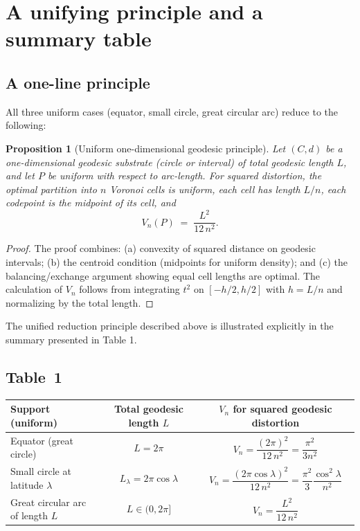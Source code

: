 \documentclass[12pt, reqno]{amsart}
\theoremstyle{plain}
\newtheorem{proposition1}[subsubsection]{Proposition}
\theoremstyle{definition}
\begin{document}
\section{A unifying principle and a summary table}

\subsection{A one-line principle}
All three uniform cases (equator, small circle, great circular arc) reduce to the following:

\begin{proposition1}[Uniform one-dimensional geodesic principle]\label{prop:unifying}
Let $(C,d)$ be a one-dimensional geodesic substrate (circle or interval) of total geodesic length $L$, and let $P$ be uniform with respect to arc-length. For squared distortion, the optimal partition into $n$ Voronoi cells is \emph{uniform}, each cell has length $L/n$, each codepoint is the midpoint of its cell, and
\[
V_n(P) \;=\; \frac{L^2}{12\,n^2}.
\]
\end{proposition1}

\begin{proof}
The proof combines: (a) convexity of squared distance on geodesic intervals; (b) the centroid condition (midpoints for uniform density); and (c) the balancing/exchange argument showing equal cell lengths are optimal. The calculation of $V_n$ follows from integrating $t^2$ on $[-h/2,h/2]$ with $h=L/n$ and normalizing by the total length.
\end{proof}
The unified reduction principle described above is illustrated explicitly in the summary
presented in Table 1.

\subsection{Table~1} 
\medskip
\begin{center}
\begin{tabular}{|l|c|c|}
\hline
\textbf{Support (uniform)} & \textbf{Total geodesic length $L$} & \textbf{$V_n$ for squared geodesic distortion}\\
\hline
Equator (great circle) & $L=2\pi$ & $V_n=\dfrac{(2\pi)^2}{12\,n^2}=\dfrac{\pi^2}{3n^2}$\\
\hline
Small circle at latitude $\lambda$ & $L_\lambda=2\pi\cos\lambda$ & $V_n=\dfrac{(2\pi\cos\lambda)^2}{12\,n^2}=\dfrac{\pi^2}{3}\dfrac{\cos^2\lambda}{n^2}$\\
\hline
Great circular arc of length $L$ & $L\in(0,2\pi]$ & $V_n=\dfrac{L^2}{12\,n^2}$\\
\hline
\end{tabular}
\end{center}
\medskip
\end{document}
